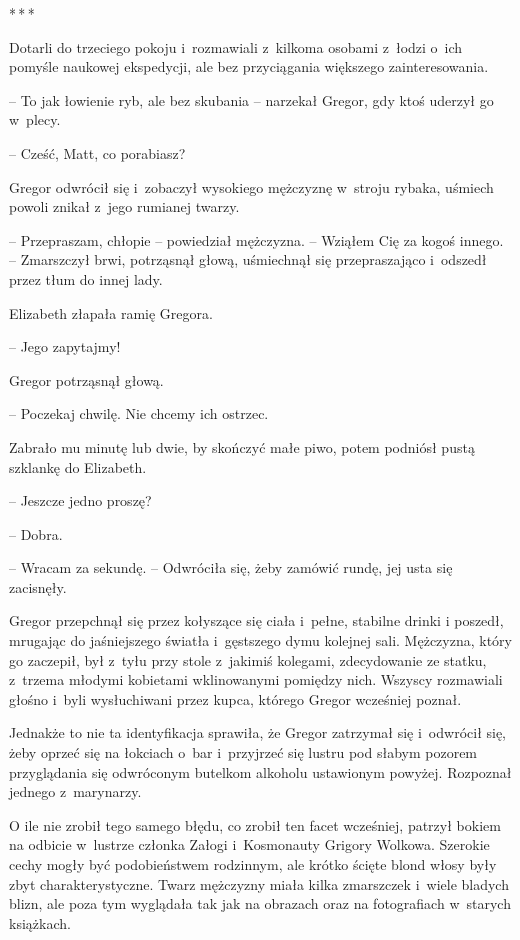 \documentclass[oneside,polish,12pt,sfheadings]{mwbk}
\newcommand{\threeast}{\bigskip\par\centerline{*\,*\,*}\medskip\par}%
\begin{document}
\threeast

Dotarli do trzeciego pokoju i~rozmawiali z~kilkoma osobami z~łodzi o~ich
pomyśle naukowej ekspedycji, ale bez przyciągania większego
zainteresowania.

-- To jak łowienie ryb, ale bez skubania -- narzekał Gregor, gdy ktoś
uderzył go w~plecy.

-- Cześć, Matt, co porabiasz?

Gregor odwrócił się i~zobaczył wysokiego mężczyznę w~stroju rybaka,
uśmiech powoli znikał z~jego rumianej twarzy.

-- Przepraszam, chłopie -- powiedział mężczyzna. -- Wziąłem Cię za kogoś
innego. -- Zmarszczył brwi, potrząsnął głową, uśmiechnął się
przepraszająco i~odszedł przez tłum do innej lady.

Elizabeth złapała ramię Gregora. 

-- Jego zapytajmy!

Gregor potrząsnął głową. 

-- Poczekaj chwilę. Nie chcemy ich ostrzec.

Zabrało mu minutę lub dwie, by skończyć małe piwo, potem podniósł pustą
szklankę do Elizabeth.

-- Jeszcze jedno proszę?

-- Dobra.

-- Wracam za sekundę. -- Odwróciła się, żeby zamówić rundę, jej usta się
zacisnęły.

Gregor przepchnął się przez kołyszące się ciała i~pełne, stabilne drinki
i poszedł, mrugając do jaśniejszego światła i~gęstszego dymu kolejnej
sali. Mężczyzna, który go zaczepił, był z~tyłu przy stole z~jakimiś
kolegami, zdecydowanie ze statku, z~trzema młodymi kobietami
wklinowanymi pomiędzy nich. Wszyscy rozmawiali głośno i~byli
wysłuchiwani przez kupca, którego Gregor wcześniej poznał.

Jednakże to nie ta identyfikacja sprawiła, że Gregor zatrzymał się i~odwrócił się, żeby oprzeć się na łokciach o~bar i~przyjrzeć się lustru
pod słabym pozorem przyglądania się odwróconym butelkom alkoholu
ustawionym powyżej. Rozpoznał jednego z~marynarzy.

O ile nie zrobił tego samego błędu, co zrobił ten facet wcześniej,
patrzył bokiem na odbicie w~lustrze członka Załogi i~Kosmonauty Grigory
Wolkowa. Szerokie cechy mogły być podobieństwem rodzinnym, ale
krótko ścięte blond włosy były zbyt charakterystyczne. Twarz mężczyzny
miała kilka zmarszczek i~wiele bladych blizn, ale poza tym wyglądała tak
jak na obrazach oraz na fotografiach w~starych książkach.
\end{document}
